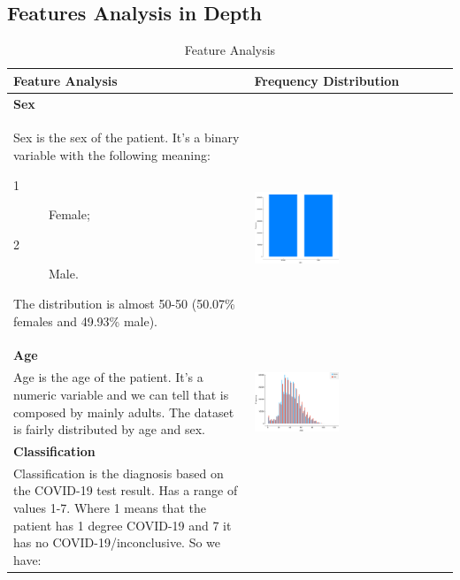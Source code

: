 
\subsection{Features Analysis in Depth}
\label{app:features-analysis-in-depth}

\begin{longtable}{P{0.45\textwidth}P{0.45\textwidth}}
\caption{Feature Analysis} 
\label{table:featureAnalysis}
\\ \hline
\textbf{Feature Analysis} & \textbf{Frequency Distribution} \\ \hline 
\textbf{Sex} & \\
Sex is the sex of the patient. It's a binary variable with the following meaning:
\begin{description}
    \item[1] Female;
    \item[2] Male.
\end{description}
The distribution is almost 50-50 (50.07\% females and 49.93\% male). 
& \includegraphics[width=0.44\textwidth]{img/appendix/feature_sex.png} 
\\ \hline
\textbf{Age} & \\
Age is the age of the patient. It's a numeric variable and we can tell that is composed 
by mainly adults. The dataset is fairly distributed by age and sex.
& \includegraphics[width=0.44\textwidth]{img/appendix/feature_age_by_sex.png} 
\\ \hline
\textbf{Classification} & \\
Classification is the diagnosis based on the COVID-19 test result. Has a range of values 1-7. Where 1 means that the patient has 1 degree COVID-19 and 7 it has no COVID-19/inconclusive. So we have:

\end{longtable}
